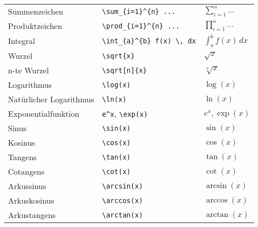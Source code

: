 \begin{table}[H]
\begin{tabular}{lll}
        Summenzeichen           & \texttt{\textbackslash sum\_\{i=1\}\^{}\{n\} ...}                   & $ \sum_{i=1}^{n} ... $     \\
        Produktzeichen          & \texttt{\textbackslash prod\_\{i=1\}\^{}\{n\} ...}                  & $ \prod_{i=1}^{n} ... $    \\
        Integral                & \texttt{\textbackslash int\_\{a\}\^{}\{b\} f(x) \textbackslash, dx} & $ \int_{a}^{b} f(x) \,dx $ \\
        Wurzel                  & \texttt{\textbackslash sqrt\{x\}}                                   & $ \sqrt{x} $               \\
        n-te Wurzel             & \texttt{\textbackslash sqrt[n]\{x\}}                                & $ \sqrt[n]{x} $            \\
        Logarithmus             & \texttt{\textbackslash log{(x)}}                                    & $ \log{(x)} $              \\
        Natürlicher Logarithmus & \texttt{\textbackslash ln{(x)}}                                     & $ \ln{(x)} $               \\
        Exponentialfunktion     & \texttt{e\^{}x}, \texttt{\textbackslash exp{(x)}}                   & $ e^x, \exp{(x)} $         \\
        Sinus                   & \texttt{\textbackslash sin{(x)}}                                    & $ \sin{(x)} $              \\
        Kosinus                 & \texttt{\textbackslash cos{(x)}}                                    & $ \cos{(x)} $              \\
        Tangens                 & \texttt{\textbackslash tan{(x)}}                                    & $ \tan{(x)} $              \\
        Cotangens               & \texttt{\textbackslash cot{(x)}}                                    & $ \cot{(x)} $              \\
        Arkussinus              & \texttt{\textbackslash arcsin{(x)}}                                 & $ \arcsin{(x)} $           \\
        Arkuskosinus            & \texttt{\textbackslash arccos{(x)}}                                 & $ \arccos{(x)} $           \\
        Arkustangens            & \texttt{\textbackslash arctan{(x)}}                                 & $ \arctan{(x)} $           \\

\end{tabular}
\end{table}
